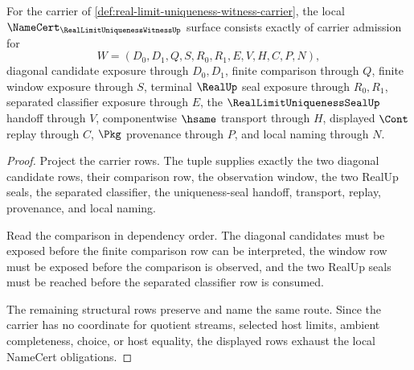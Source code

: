 \begin{theorem}
\label{thm:real-limit-uniqueness-witness-obligation-surface}
For the carrier of \autoref{def:real-limit-uniqueness-witness-carrier}, the local $\NameCert_{\RealLimitUniquenessWitnessUp}$ surface consists exactly of carrier admission for
$$
W=(D_0,D_1,Q,S,R_0,R_1,E,V,H,C,P,N),
$$
diagonal candidate exposure through $D_0,D_1$, finite comparison through $Q$, finite window exposure through $S$, terminal $\RealUp$ seal exposure through $R_0,R_1$, separated classifier exposure through $E$, the $\RealLimitUniquenessSealUp$ handoff through $V$, componentwise $\hsame$ transport through $H$, displayed $\Cont$ replay through $C$, $\Pkg$ provenance through $P$, and local naming through $N$.
\end{theorem}
\begin{proof}
Project the carrier rows. The tuple supplies exactly the two diagonal candidate rows, their comparison row, the observation window, the two RealUp seals, the separated classifier, the uniqueness-seal handoff, transport, replay, provenance, and local naming.

Read the comparison in dependency order. The diagonal candidates must be exposed before the finite comparison row can be interpreted, the window row must be exposed before the comparison is observed, and the two RealUp seals must be reached before the separated classifier row is consumed.

The remaining structural rows preserve and name the same route. Since the carrier has no coordinate for quotient streams, selected host limits, ambient completeness, choice, or host equality, the displayed rows exhaust the local NameCert obligations.
\end{proof}

